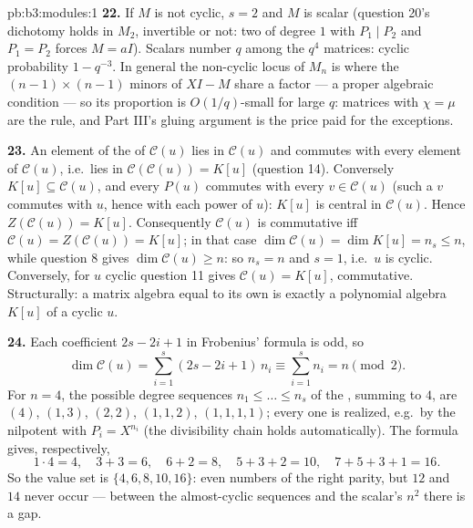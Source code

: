 \begin{solution}{pb:b3:modules:1}
\textbf{22.} If $M$ is not cyclic, $s = 2$ and $M$ is scalar
(question 20's dichotomy holds in $M_2$, invertible or not: two
 of degree $1$ with $P_1 \mid P_2$ and $P_1 =
P_2$ forces $M = aI$). Scalars number $q$ among the $q^4$
matrices: cyclic probability $1 - q^{-3}$. In general the
non-cyclic locus of $M_n$ is where the $(n-1)\times(n-1)$ minors
of $XI - M$ share a factor --- a proper algebraic condition
--- so its proportion is $O(1/q)$-small for large $q$: matrices
with $\chi = \mu$ are the rule, and Part III's gluing argument
is the price paid for the exceptions.

\textbf{23.} An element of the  of $\mathcal C(u)$ lies
in $\mathcal C(u)$ and commutes with every element of
$\mathcal C(u)$, i.e.\ lies in $\mathcal C(\mathcal C(u)) =
K[u]$ (question 14). Conversely $K[u] \subseteq \mathcal C(u)$,
and every $P(u)$ commutes with every $v \in \mathcal C(u)$
(such a $v$ commutes with $u$, hence with each power of $u$):
$K[u]$ is central in $\mathcal C(u)$. Hence $Z(\mathcal C(u))
= K[u]$. Consequently $\mathcal C(u)$ is commutative iff
$\mathcal C(u) = Z(\mathcal C(u)) = K[u]$; in that case
$\dim\mathcal C(u) = \dim K[u] = n_s \leq n$, while question 8
gives $\dim\mathcal C(u) \geq n$: so $n_s = n$ and $s = 1$,
i.e.\ $u$ is cyclic. Conversely, for $u$ cyclic question 11
gives $\mathcal C(u) = K[u]$, commutative. Structurally: a
matrix algebra equal to its own  is exactly a
polynomial algebra $K[u]$ of a cyclic $u$.

\textbf{24.} Each coefficient $2s - 2i + 1$ in Frobenius'
formula is odd, so
\[
\dim\mathcal C(u) = \sum_{i=1}^s(2s - 2i + 1)\,n_i
\equiv \sum_{i=1}^s n_i = n \pmod 2 .
\]
For $n = 4$, the possible degree sequences $n_1 \leq \dots
\leq n_s$ of the , summing to $4$, are $(4)$,
$(1, 3)$, $(2, 2)$, $(1, 1, 2)$, $(1, 1, 1, 1)$; every one is
realized, e.g.\ by the nilpotent with $P_i = X^{n_i}$ (the
divisibility chain holds automatically). The formula gives,
respectively,
\[
1\cdot4 = 4, \quad 3 + 3 = 6, \quad 6 + 2 = 8, \quad
5 + 3 + 2 = 10, \quad 7 + 5 + 3 + 1 = 16 .
\]
So the value set is $\{4, 6, 8, 10, 16\}$: even numbers of the
right parity, but $12$ and $14$ never occur --- between the
almost-cyclic sequences and the scalar's $n^2$ there is a gap.


\end{solution}
